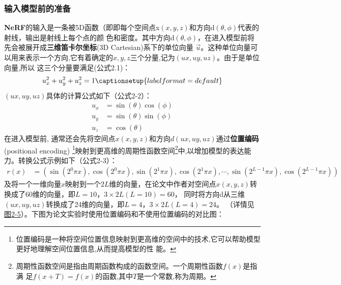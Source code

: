 \documentclass{nwputhesis}
\begin{document}
\subsubsection{输入模型前的准备}
\textbf{NeRF}的输入是一条被5D函数（即即每个空间点x$(x,y,z)$和方向d$(\theta,\phi)$代表的射线，输出是射线上每个点的颜
色和密度。其中方向d$(\theta,\phi)$，在进入模型前将先会被展开成\textbf{三维笛卡尔坐标}(3D Cartesian)系下的单位向量
\(\vec{u}\)。这种单位向量可以用来表示一个方向,它有着确定的$x,y,z$三个分量,记为$(ux, uy, uz)$。由于是单位向量,所以
这三个分量要满足(公式2.1)：
\begin{equation}
    \begin{aligned}
        u_x^2 + u_y^2 + u_z^2 = 1
        \captionsetup{labelformat=default}
    \end{aligned}
\end{equation}
$(ux, uy, uz)$具体的计算公式如下（公式2-2）：
\begin{equation}
    \begin{aligned}
        u_x &= \sin(\theta)\cos(\phi)\\
        u_y &= \sin(\theta)\sin(\phi)\\
        u_z &= \cos(\theta)
    \end{aligned}
\end{equation}
\indent
在进入模型前, 通常还会先将空间点$x(x,y,z)$和方向$d(ux, uy, uz)$通过\textbf{位置编码}(positional encoding)
\footnote{位置编码是一种将空间位置信息映射到更高维的空间中的技术,它可以帮助模型更好地理解空间位置信息,从而提高模型的性
能。}映射到更高维的周期性函数空间\footnote{周期性函数空间是指由周期函数构成的函数空间。一个周期性函数$f(x)$是指满
足$f(x+T) = f(x)$的函数,其中$T$是一个常数,称为周期。}中,以增加模型的表达能力。转换公式示例如下（公式2-3）：
\begin{equation}
    \begin{aligned}
        r(x) &= (\sin(2^0\pi x), \cos(2^0\pi x), \sin(2^1\pi x), \cos(2^1\pi x), \cdots, \sin(2^{L-1}\pi x), \cos(2^{L-1}\pi x))
    \end{aligned}
\end{equation}
\indent
及将一个一维向量$x$映射到一个$2L$维的向量，在论文中作者对空间点$x(x,y,z)$转换成了60维的向量，即$L=10$，$3 \times 2L(L=10) = 60$，
同时将方向d从三维$(ux, uy, uz)$转换成了24维的向量，即$L=4$，$3 \times 2L(L=4) = 24$。
（详情见\hyperlink{图2-5}{图2-5}）。下图为论文实验时使用位置编码和不使用位置编码的对比图：
\end{document}
